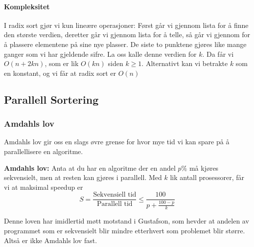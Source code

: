 \paragraph{Kompleksitet}
I radix sort gjør vi kun lineære operasjoner: Først går vi gjennom lista for å
finne den største verdien, deretter går vi gjennom lista for å telle, så går vi
gjennom for å plassere elementene på sine nye plasser. De siste to punktene
gjøres like mange ganger som vi har gjeldende sifre. La oss kalle denne verdien
for $k$. Da får vi $O(n + 2kn)$, som er lik $O(kn)$ siden $k\geq 1$. Alternativt
kan vi betrakte $k$ som en konstant, og vi får at radix sort er $O(n)$


\subsection{Parallell Sortering}

\subsubsection{Amdahls lov}
\label{sec:amdahl}

Amdahls lov gir oss en slags øvre grense for hvor mye tid vi kan spare på å
parallellisere en algoritme.
\begin{teorem}\textbf{Amdahls lov: } 
  Anta at du har en algoritme der en andel
  $p\%$ må kjøres sekvensielt, men at resten kan gjøres i parallell.
  Med $k$ lik antall prosessorer, får vi at maksimal speedup er
  \[
    S = \frac{\text{Sekvensiell tid}}{\text{Parallell tid}} \leq \frac{100}{p + \frac{100 - p}{k}}
  \]
\end{teorem}

Denne loven har imidlertid møtt motstand i Gustafson, som hevder at andelen av
programmet som er sekvensielt blir mindre etterhvert som problemet blir større.
Altså er ikke Amdahls lov fast.

